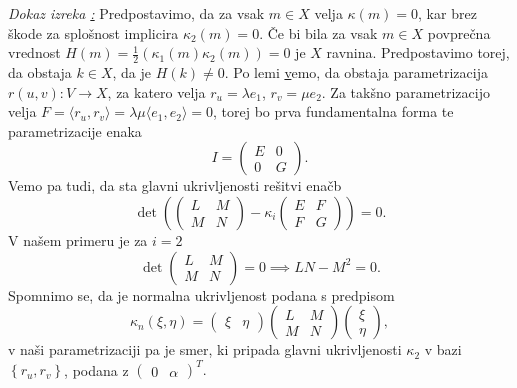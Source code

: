 \noindent
{\em Dokaz izreka \href{izr_plsokev_je_ploscata_ce_je_del_valja_ali_tangentnopremosnosne_ploskve}:\/}
Predpostavimo, da za vsak $m \in X$ velja $\kappa(m) = 0$, kar brez škode za splošnost implicira $\kappa_2(m) = 0$. Če bi bila za vsak $m \in X$ povprečna vrednost $H(m) = \frac{1}{2}(\kappa_1(m) \kappa_2(m))= 0$ je $X$ ravnina. Predpostavimo torej, da obstaja
$k \in  X$, da je $H(k) \neq 0$.
Po lemi \href{lem_obstoj_funkcij} vemo, da obstaja parametrizacija $r(u,v): V \to X$, za katero velja $r_u = \lambda e_1$, $r_v = \mu e_2$. 
Za takšno parametrizacijo velja $F = \langle r_u, r_v \rangle = \lambda \mu \langle e_1, e_2 \rangle = 0$, torej bo prva fundamentalna forma te parametrizacije enaka \begin{equation*}
I = \begin{pmatrix}
E & 0 \\
0 & G
\end{pmatrix}.
\end{equation*}  
Vemo pa tudi, da sta glavni ukrivljenosti rešitvi enačb \begin{equation*} \det \left( \begin{pmatrix}
  L & M \\
  M & N
  \end{pmatrix} - \kappa_i \begin{pmatrix}
  E & F \\
  F & G
  \end{pmatrix}  \right) = 0. \end{equation*}
V našem primeru je za $i = 2$ \begin{equation*}
  \det  \begin{pmatrix}
    L & M \\
    M & N
    \end{pmatrix} = 0 \implies LN - M^2 = 0.
\end{equation*}  
Spomnimo se, da je normalna ukrivljenost podana s predpisom \begin{equation*}
\kappa_n(\xi, \eta) = \begin{pmatrix}
    \xi & \eta
\end{pmatrix} \begin{pmatrix}
L & M \\
M & N
\end{pmatrix} \begin{pmatrix}
  \xi \\ \eta
\end{pmatrix},
\end{equation*}  
v naši parametrizaciji pa je smer, ki pripada glavni ukrivljenosti $\kappa_2$ v bazi $\left\{ r_u, r_v\right\}$, podana z $\begin{pmatrix}
    0 & \alpha
\end{pmatrix}^{T}.$
